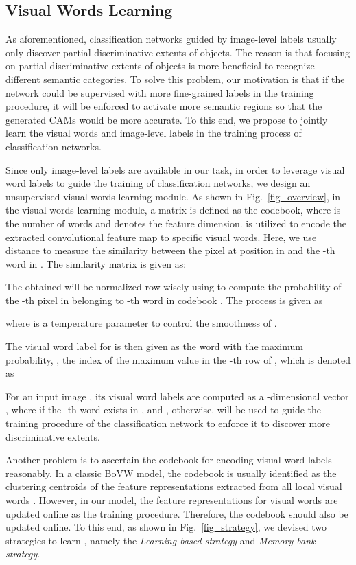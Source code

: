 \subsection{Visual Words Learning}
\par As aforementioned, classification networks guided by image-level labels usually only discover partial discriminative extents of objects. The reason is that focusing on partial discriminative extents of objects is more beneficial to recognize different semantic categories. To solve this problem, our motivation is that if the network could be supervised with more fine-grained labels in the training procedure, it will be enforced to activate more semantic regions so that the generated CAMs would be more accurate.
To this end, we propose to jointly learn the visual words and image-level labels in the training process of classification networks.
\par Since only image-level labels are available in our task, in order to leverage visual word labels to guide the training of classification networks, we design an unsupervised visual words learning module. As shown in Fig.~\ref{fig_overview}, in the visual words learning module, a matrix  is defined as the codebook, where  is the number of words and  denotes the feature dimension.  is utilized to encode the extracted convolutional feature map  to specific visual words. Here, we use  distance to measure the similarity between the pixel at position  in  and the -th word in . The similarity matrix  is given as:

\par The obtained  will be normalized row-wisely using  to compute the probability of the -th pixel in  belonging to -th word in codebook . The process is given as

where  is a temperature parameter to control the smoothness of .
\par The visual word label  for  is then given as the word with the maximum probability, \ie, the index of the maximum value in the -th row of , which is denoted as

\par For an input image , its visual word labels are computed as a -dimensional vector , where  if the -th word exists in , and , otherwise.  will be used to guide the training procedure of the classification network to enforce it to discover more discriminative extents.
\par Another problem is to ascertain the codebook for encoding visual word labels reasonably. In a classic BoVW model, the codebook is usually identified as the clustering centroids of the feature representations extracted from all local visual words \citep{liu2019bow,gidaris2020learning}. However, in our model, the feature representations for visual words are updated online as the training procedure. Therefore, the codebook  should also be updated online. To this end, as shown in Fig.~\ref{fig_strategy}, we devised two strategies to learn , namely the \textit{Learning-based strategy} and \textit{Memory-bank strategy}.

